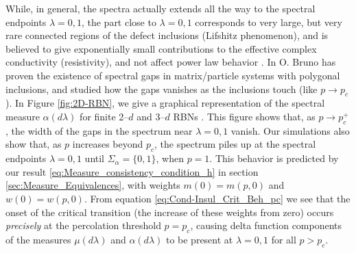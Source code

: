 \documentclass[english,12pt,jmp,graphicx]{revtex4-1}
\begin{document}
While, in general, the spectra actually extends all the way
to the spectral endpoints $\lambda=0,1$, the part close to $\lambda=0,1$
corresponds to very large, but very rare connected regions of the
defect inclusions (Lifshitz phenomenon), and is
believed to give exponentially small contributions to the effective
complex conductivity (resistivity), and not
affect power law behavior \cite{Golden:PRL-3935}. In
\cite{Bruno:PRSLA-353} O. Bruno has proven the existence of spectral
gaps in matrix/particle systems with polygonal inclusions, and studied
how the gaps vanishes as the inclusions touch (like $p\to p_c$). In
Figure \ref{fig:2D-RBN}, we give a graphical representation of the
spectral measure $\alpha(d\lambda)$ for finite 2--$d$ and 3--$d$ RBNs
\cite{Golden:JoB:337}. This figure shows that, as $p\to p_c^+$, the width
of the gaps in the spectrum near $\lambda=0,1$ vanish. Our simulations also show
that, as $p$ increases beyond $p_c$, the spectrum piles up at the spectral
endpoints $\lambda=0,1$ until $\Sigma_\alpha=\{0,1\}$, when $p=1$. This behavior is
predicted by our result \eqref{eq:Measure_consistency_condition_h} in
section \ref{sec:Measure_Equivalences}, with weights $m(0)=m(p,0)$ and
$w(0)=w(p,0)$. From equation \eqref{eq:Cond-Insul_Crit_Beh_pc} we see
that the onset of the critical transition (the increase of these
weights from zero) occurs \emph{precisely} at the percolation
threshold $p=p_c$, causing delta function components of the measures
$\mu(d\lambda)$ and $\alpha(d\lambda)$ to be present at $\lambda=0,1$ for all $p>p_c$.  
\end{document}

